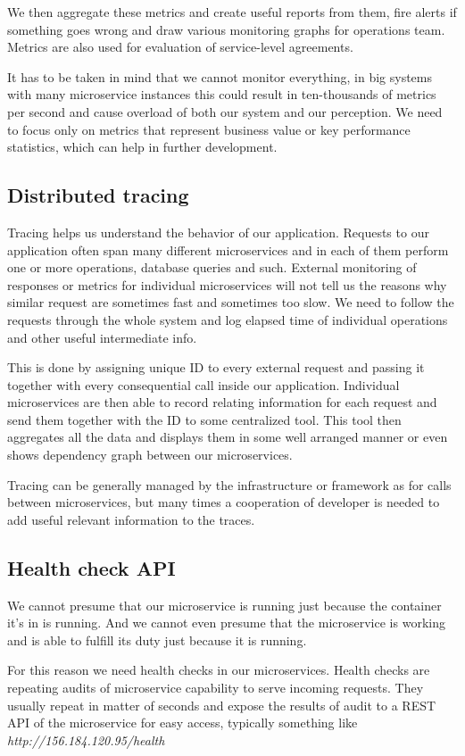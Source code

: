 \documentclass[12pt,oneside]{fithesis2}
\begin{document}
We then aggregate these metrics and create useful reports from them, fire alerts if something goes wrong and draw various monitoring graphs for operations team. Metrics are also used for evaluation of service-level agreements.

It has to be taken in mind that we cannot monitor everything, in big systems with many microservice instances this could result in ten-thousands of metrics per second and cause overload of both our system and our perception. We need to focus only on metrics that represent business value or key performance statistics, which can help in further development.

\subsection{Distributed tracing}
Tracing helps us understand the behavior of our application. Requests to our application often span many different microservices and in each of them perform one or more operations, database queries and such. External monitoring of responses or metrics for individual microservices will not tell us the reasons why similar request are sometimes fast and sometimes too slow. We need to follow the requests through the whole system and log elapsed time of individual operations and other useful intermediate info.

This is done by assigning unique ID to every external request and passing it together with every consequential call inside our application. Individual microservices are then able to record relating information for each request and send them together with the ID to some centralized tool. This tool then aggregates all the data and displays them in some well arranged manner or even shows dependency graph between our microservices. 

Tracing can be generally managed by the infrastructure or framework as for calls between microservices, but many times a cooperation of developer is needed to add useful relevant information to the traces.

\subsection{Health check API}
We cannot presume that our microservice is running just because the container it's in is running. And we cannot even presume that the microservice is working and is able to fulfill its duty just because it is running. 

For this reason we need health checks in our microservices. Health checks are repeating audits of microservice capability to serve incoming requests. They usually repeat in matter of seconds and expose the results of audit to a REST API of the microservice for easy access, typically something like \textit{http://156.184.120.95/health}
\end{document}
